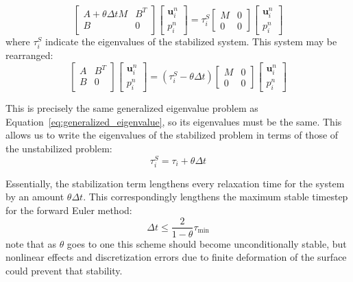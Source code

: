 \documentclass[preprint,12pt,authoryear]{elsarticle}
\begin{document}
\begin{equation}
\begin{bmatrix}
A + \theta \Delta t M & B^T \\
B & 0 \\
\end{bmatrix}
\begin{bmatrix}
\mathbf{u}^n_i \\
p^n_i
\end{bmatrix}
=
\tau^S_i
\begin{bmatrix}
M & 0 \\
0 & 0
\end{bmatrix}
\begin{bmatrix}
\mathbf{u}^n_i \\
p^n_i
\end{bmatrix}
\label{eq:generalized_eigenvalue}
\end{equation}
where $\tau^S_i$ indicate the eigenvalues of the stabilized system.
This system may be rearranged:
\begin{equation}
\begin{bmatrix}
A & B^T \\
B & 0 \\
\end{bmatrix}
\begin{bmatrix}
\mathbf{u}^n_i \\
p^n_i
\end{bmatrix}
=
\left(\tau^S_i - \theta \Delta t \right)
\begin{bmatrix}
M & 0 \\
0 & 0
\end{bmatrix}
\begin{bmatrix}
\mathbf{u}^n_i \\
p^n_i
\end{bmatrix}
\label{eq:generalized_eigenvalue}
\end{equation}

This is precisely the same generalized eigenvalue problem as Equation~\eqref{eq:generalized_eigenvalue},
so its eigenvalues must be the same.  This allows us to write the eigenvalues of the stabilized problem in
terms of those of the unstabilized problem:
\begin{equation}
\tau^S_i = \tau_i + \theta \Delta t
\end{equation}

Essentially, the stabilization term lengthens every relaxation time for the system by an amount $\theta \Delta t$.
This correspondingly lengthens the maximum stable timestep for the forward Euler method:
\begin{equation}
\Delta t  \le \frac{2}{1-\theta} \tau_{\mathrm{min}}
\label{eq:cfl_euler_stabilized}
\end{equation}
note that as $\theta$ goes to one this scheme should become unconditionally stable,
but nonlinear effects and discretization errors due to finite deformation of the surface could 
prevent that stability.
\end{document}
